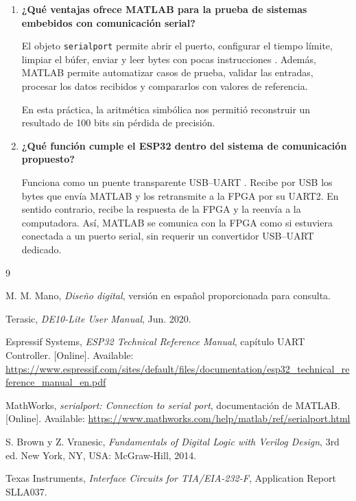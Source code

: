 \documentclass[11pt,letterpaper]{article}
\begin{document}
\begin{enumerate}
  \item \textbf{¿Qué ventajas ofrece MATLAB para la prueba de sistemas
  embebidos con comunicación serial?}

  El objeto \texttt{serialport} permite abrir el puerto, configurar el tiempo
  límite, limpiar el búfer, enviar y leer bytes con pocas instrucciones
  \cite{matlab}. Además, MATLAB permite automatizar casos de prueba, validar
  las entradas, procesar los datos recibidos y compararlos con valores de
  referencia.

  En esta práctica, la aritmética simbólica nos permitió reconstruir un
  resultado de 100 bits sin pérdida de precisión.

  \item \textbf{¿Qué función cumple el ESP32 dentro del sistema de
  comunicación propuesto?}

  Funciona como un puente transparente USB--UART \cite{esp32}. Recibe por USB
  los bytes que envía MATLAB y los retransmite a la FPGA por su UART2. En
  sentido contrario, recibe la respuesta de la FPGA y la reenvía a la
  computadora. Así, MATLAB se comunica con la FPGA como si estuviera conectada
  a un puerto serial, sin requerir un convertidor USB--UART dedicado.
\end{enumerate}

\begin{thebibliography}{9}

M. M. Mano, \textit{Diseño digital}, versión en español proporcionada para
consulta.

Terasic, \textit{DE10-Lite User Manual}, Jun. 2020.

Espressif Systems, \textit{ESP32 Technical Reference Manual}, capítulo UART
Controller. [Online]. Available:
\url{https://www.espressif.com/sites/default/files/documentation/esp32_technical_reference_manual_en.pdf}

MathWorks, \textit{serialport: Connection to serial port}, documentación de
MATLAB. [Online]. Available:
\url{https://www.mathworks.com/help/matlab/ref/serialport.html}

S. Brown y Z. Vranesic, \textit{Fundamentals of Digital Logic with Verilog
Design}, 3rd ed. New York, NY, USA: McGraw-Hill, 2014.

Texas Instruments, \textit{Interface Circuits for TIA/EIA-232-F}, Application
Report SLLA037.

\end{thebibliography}
\end{document}
